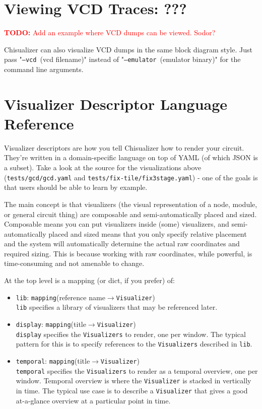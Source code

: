 \documentclass[11pt]{article}
\newcommand{\todo}[1]{\textcolor{red}{\textbf{TODO:} #1}}
\begin{document}
\section{Viewing VCD Traces: ???}
\todo{Add an example where VCD dumps can be viewed. Sodor?}

Chisualizer can also visualize VCD dumps in the same block diagram style. Just pass "\texttt{--vcd }(vcd filename)" instead of "\texttt{--emulator }(emulator binary)" for the command line arguments.

\section{Visualizer Descriptor Language Reference}
Visualizer descriptors are how you tell Chisualizer how to render your circuit. They're written in a domain-specific language on top of YAML (of which JSON is a subset). Take a look at the source for the visualizations above (\texttt{tests/gcd/gcd.yaml} and \texttt{tests/fix-tile/fix3stage.yaml}) - one of the goals is that users should be able to learn by example.

The main concept is that visualizers (the visual representation of a node, module, or general circuit thing) are composable and semi-automatically placed and sized. Composable means you can put visualizers inside (some) visualizers, and semi-automatically placed and sized means that you only specify relative placement and the system will automatically determine the actual raw coordinates and required sizing. This is because working with raw coordinates, while powerful, is time-consuming and not amenable to change.

At the top level is a mapping (or dict, if you prefer) of:
\begin{itemize}
  \item \texttt{lib}: \texttt{mapping}(reference name$\rightarrow$\texttt{Visualizer}) \\
  \texttt{lib} specifies a library of visualizers that may be referenced later.

  \item \texttt{display}: \texttt{mapping}(title$\rightarrow$\texttt{Visualizer}) \\
  \texttt{display} specifies the \texttt{Visualizers} to render, one per window. The typical pattern for this is to specify references to the \texttt{Visualizers} described in \texttt{lib}.
  
  \item \texttt{temporal}: \texttt{mapping}(title$\rightarrow$\texttt{Visualizer}) \\
  \texttt{temporal} specifies the \texttt{Visualizers} to render as a temporal overview, one per window. Temporal overview is where the \texttt{Visualizer} is stacked in vertically in time. The typical use case is to describe a \texttt{Visualizer} that gives a good at-a-glance overview at a particular point in time.
\end{itemize}
\end{document}
